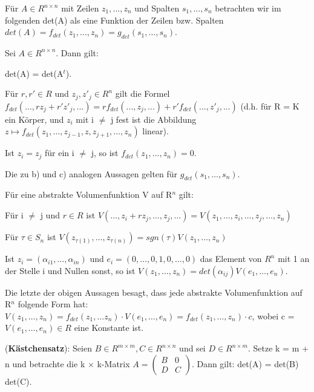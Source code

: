 Für $A \in R^{n \times n}$ mit Zeilen $z_1, ..., z_n$ und Spalten $s_1, ..., s_n$ betrachten wir im folgenden det(A) als eine Funktion der Zeilen bzw. Spalten $det(A) = f_{det}(z_1,..., z_n) = g_{det}(s_1, ..., s_n)$.

\begin{lemma}
Sei $A \in R^{n \times n}$. Dann gilt:
\begin{compactenum}
\item det(A) = det(A$^t$).
\item Für $r, r' \in R$ und $z_j,z'_j \in R^n$ gilt die Formel $f_{det}(...,rz_j + r'z'_j,...) = r f_{det}(...,z_j,...) + r' f_{det}(...,z'_j,...)$ (d.h. für R = K ein Körper, und $z_i$ mit i $\neq$ j fest ist die Abbildung $z \mapsto f_{det}(z_1,… , z_{j-1}, z, z_{j+1},… , z_n)$ linear). 
\item Ist $z_i = z_j$ für ein i $\neq$ j, so ist $f_{det}(z_1, ..., z_n) = 0$.
\item Die zu b) und c) analogen Aussagen gelten für $g_{det}(s_1, …, s_n)$.
\end{compactenum}
\end{lemma}

\begin{proposition}
Für eine abstrakte Volumenfunktion V auf R$^n$ gilt:
\begin{compactenum}
\item Für i $\neq$ j und $r \in R$ ist $V(…, z_i + rz_j, …, z_j, …) = V(z_1, …, z_i, …, z_j, …, z_n)$
\item Für $\tau \in S_n$ ist $V(z_{\tau(1)}, …, z_{\tau(n)}) = sgn(\tau)V(z_1, …, z_n)$
\item Ist $z_i = (\alpha_{i1}, …, \alpha_{in})$ und $e_i = (0, …, 0, 1, 0, …, 0)$ das Element von $R^n$ mit 1 an der Stelle i und Nullen sonst, so ist $V(z_1, …, z_n) = det(\alpha_{ij}) V(e_1, …, e_n)$.
\end{compactenum}
\end{proposition}

\begin{remark}
Die letzte der obigen Aussagen besagt, dass jede abstrakte Volumenfunktion auf R$^n$ folgende Form hat:
$V (z_1, …, z_n) = f_{det}(z_1, … z_n) \cdot V (e_1, …, e_n) = f_{det}(z_1, …, z_n) \cdot c$, wobei c = $V (e_1,…, e_n) \in R$ eine Konstante ist.
\end{remark}

\begin{lemma}
(\textbf{Kästchensatz}): Seien $B \in R^{m \times m},C \in R^{n \times n}$ und sei $D \in R^{n \times m}$. Setze k = m + n und betrachte die k $\times$ k-Matrix $A = \begin{pmatrix} B & 0 \\ D & C \end{pmatrix}$. Dann gilt: det(A) = det(B) det(C).
\end{lemma}

